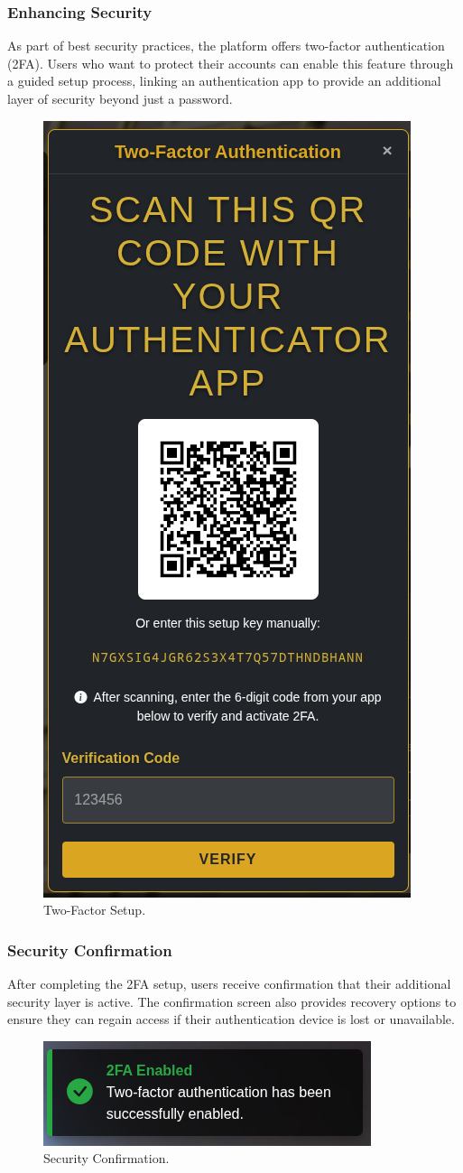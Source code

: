 \subsubsection{Enhancing Security} As part of best security practices, the platform offers two-factor authentication (2FA). Users who want to protect their accounts can enable this feature through a guided setup process, linking an authentication app to provide an additional layer of security beyond just a password.

\begin{figure}[H]
    \centering
    \includegraphics[width=0.4\linewidth]{Figures/images/new_images/Enabling2FA.png}
    \caption{Two-Factor Setup.} %
    \label{fig:2fa-setup-journey}
\end{figure}

\subsubsection{Security Confirmation} After completing the 2FA setup, users receive confirmation that their additional security layer is active. The confirmation screen also provides recovery options to ensure they can regain access if their authentication device is lost or unavailable.

\begin{figure}[H]
    \centering
    \includegraphics[width=0.65\linewidth]{Figures/images/new_images/2FASuccessfullyEnabled.png}
    \caption{Security Confirmation.} %
    \label{fig:2fa-confirmation-journey}
\end{figure}

